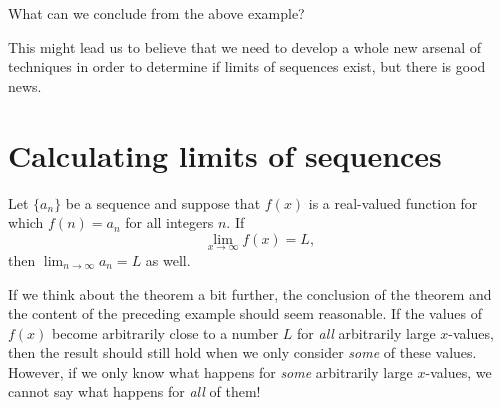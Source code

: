 \documentclass{ximera}
\begin{document}
What can we conclude from the above example?

\begin{multipleChoice}
\end{multipleChoice}

This might lead us to believe that we need to develop a whole new arsenal of techniques in order to determine if limits of sequences exist, but there is good news.

\section{Calculating limits of sequences}

\begin{theorem}
  Let $\{a_n\}$ be a sequence and suppose that $f(x)$ is a real-valued function for which $f(n) = a_n$ for all integers $n$.  If
  \[
  \lim_{x\to\infty}f(x)=L,
  \]
  then $\lim_{n\to\infty} a_n=L$ as well.
\end{theorem}

If we think about the theorem a bit further, the conclusion  of the theorem and the content of the preceding example should seem reasonable.  If the values of $f(x)$ become arbitrarily close to a number $L$ for \emph{all} arbitrarily large $x$-values, then the result should still hold when we only consider \emph{some} of these values.  However, if we only know what happens for \emph{some} arbitrarily large $x$-values, we cannot say what happens for \emph{all} of them!

%

\end{document}
